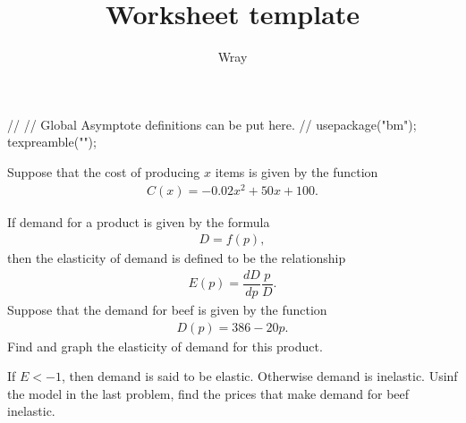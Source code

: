 \documentclass[addpoints, 12pt]{exam}
\title{Worksheet template}
\author{Wray}
\begin{document}
\begin{asydef}
//
// Global Asymptote definitions can be put here.
//
usepackage("bm");
texpreamble("\def\V#1{\bm{#1}}");
\end{asydef}


\bigskip

\begin{questions}

\question
Suppose that the cost of producing $x$ items is given by the function
\begin{align*}
	C(x) = -0.02x^2 + 50x + 100.
\end{align*}

\question
If demand for a product is given by the formula
\begin{align*}
D = f(p),
\end{align*}
then the elasticity of demand is defined to be the relationship
\begin{align*}
E(p) = \dfrac{dD}{dp} \dfrac{p}{D}.
\end{align*}
Suppose that the demand for beef is given by the function
\begin{align*}
D(p) = 386 - 20p.
\end{align*}
Find and graph the elasticity of demand for this product.

\question
If $E < -1$, then demand is said to be elastic.  Otherwise demand is inelastic.  Usinf the model in the last problem, find the prices that make demand for beef inelastic.

\end{questions}
\end{document}

